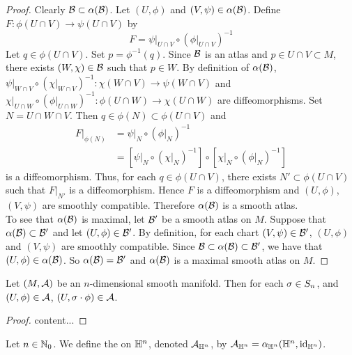 \documentclass{book}
\begin{document}
	\begin{proof}
		Clearly $\mathcal{B} \subset \alpha(\mathcal{B})$. Let $(U, \phi)$ and $(V, \psi) \in \alpha(\mathcal{B})$. Define $F: \phi(U \cap V) \rightarrow \psi (U \cap V)$ by 
		$$F = \psi|_{U \cap V} \circ (\phi|_{U \cap V})^{-1}$$
		Let $q \in \phi(U \cap V)$. Set $p = \phi^{-1}(q)$. Since $\mathcal{B}$ is an atlas and $p \in U \cap V \subset M$, there exists $(W, \chi) \in \mathcal{B}$ such that $p \in W$. By definition of $\alpha(\mathcal{B})$, $\psi|_{W \cap V} \circ (\chi|_{W \cap V})^{-1} : \chi(W \cap V) \rightarrow \psi(W \cap V)$ and $ \chi|_{U \cap W} \circ (\phi|_{U \cap W})^{-1} : \phi(U \cap W) \rightarrow \chi(U \cap W)$ are diffeomorphisms. Set $N = U \cap W \cap V$. Then $q \in \phi(N) \subset \phi(U \cap V)$ and 
		\begin{align*}
			F|_{\phi(N)}
			& = \psi|_{N} \circ (\phi|_{N})^{-1} \\
			& = [\psi|_{N} \circ (\chi|_{N})^{-1}] \circ [\chi|_{N} \circ (\phi|_{N})^{-1}]
		\end{align*}
		is a diffeomorphism. 
		Thus, for each $q \in \phi(U \cap V)$, there exists $N' \subset \phi(U \cap V)$ such that $F|_{N'}$ is a diffeomorphism. Hence $F$ is a diffeomorphism and $(U, \phi)$, $(V, \psi)$ are smoothly compatible. Therefore $\alpha(\mathcal{B})$ is a smooth atlas.\\
		To see that $\alpha(\mathcal{B})$ is maximal, let $\mathcal{B}'$ be a smooth atlas on $M$. Suppose that $\alpha(\mathcal{B}) \subset \mathcal{B}'$ and let $(U, \phi) \in \mathcal{B}'$. By definition, for each chart $(V, \psi) \in \mathcal{B}'$, $(U, \phi)$ and $(V, \psi)$ are smoothly compatible. Since $\mathcal{B} \subset \alpha(\mathcal{B}) \subset \mathcal{B}'$, we have that $(U, \phi) \in \alpha(\mathcal{B})$. So $\alpha(\mathcal{B}) = \mathcal{B}'$ and $\alpha(\mathcal{B})$ is a maximal smooth atlas on $M$.
	\end{proof}

	\begin{ex} 
		Let $(M, \mathcal{A})$ be an $n$-dimensional smooth manifold. Then for each $\sigma \in S_n$, and $(U, \phi) \in \mathcal{A}$, $(U, \sigma \cdot \phi) \in \mathcal{A}$.
	\end{ex}

	\begin{proof}
		content...
	\end{proof}

	\begin{defn} 
		Let $n \in \mathbb{N}_0$. We define the  on $\mathbb{H}^n$, denoted $\mathcal{A}_{\mathbb{H}^n}$, by $\mathcal{A}_{\mathbb{H}^n} = \alpha_{\mathbb{H}^n}(\mathbb{H}^n, \operatorname{id}_{\mathbb{H}^n})$.  
	\end{defn}
\end{document}
